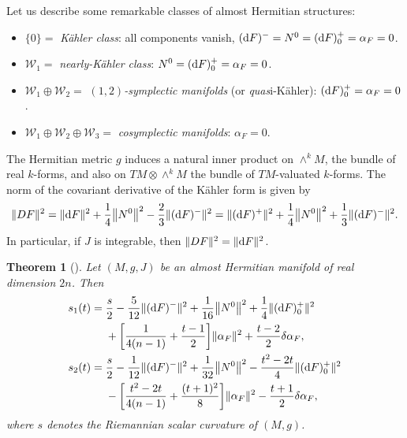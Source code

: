 \documentclass[pdftex]{sigma}%
\numberwithin{equation}{section}
\newtheorem{Theorem}{Theorem}[section]
\begin{document}
Let us describe some remarkable classes of almost Hermitian structures:
\begin{itemize}\itemsep=0pt

\item $\{0\}=$ {\em K\"ahler class}: all components vanish, $({\rm d}F)^{-}= N^{0}=({\rm d}F)^{+}_{0}=\alpha_{F}=0$.

\item $\mathcal{W}_{1}=$ {\em nearly-K\"ahler class}: $N^{0} = ({\rm d}F)^{+}_{0}= \alpha_{F}=0$.

\item $\mathcal{W}_{1}\oplus \mathcal{W}_{2}=$ {\em $(1,2)$-symplectic manifolds} (or {\it quas}i-K\"ahler): $({\rm d}F)^{+}_{0}=\alpha_{F}=0$.

\item $\mathcal{W}_{1}\oplus \mathcal{W}_{2}\oplus \mathcal{W}_{3}=$ {\em cosymplectic manifolds}: $\alpha_{F}=0$.
\end{itemize}

The Hermitian metric $g$ induces a natural inner product on $\wedge^{k}M$, the bundle of real $k$-forms, and also on $TM\otimes \wedge^{k}M$ the bundle of $TM$-valuated $k$-forms. The norm of the covariant derivative of the K\"ahler form is given by
\begin{align*}
\|DF\|^{2}=\|{\rm d}F\|^{2}+\dfrac{1}{4}\big\|N^{0}\big\|^{2}-\dfrac{2}{3}\|({\rm d}F)^{-}\|^{2}
=\|({\rm d}F)^{+}\|^{2}+\dfrac{1}{4}\big\|N^{0}\big\|^{2}+\dfrac{1}{3}\|({\rm d}F)^{-}\|^{2}.
\end{align*}
In particular, if $J$ is integrable, then $\|DF\|^{2}=\|{\rm d}F\|^{2}$.

\begin{Theorem}[{\cite[Theorem 4.3]{fu}}]\label{teo1}
Let $(M,g,J)$ be an almost Hermitian manifold of real dimension $2n$. Then
\begin{align*}
s_{1}(t)={}&\dfrac{s}{2}-\dfrac{5}{12}\|({\rm d}F)^{-}\|^{2}+\dfrac{1}{16}\big\|N^{0}\big\|^{2}+\dfrac{1}{4}\|({\rm d}F)_{0}^{+}\|^{2}
\\
&+\bigg[\dfrac{1}{4(n-1)}+\dfrac{t-1}{2}\bigg]\|\alpha_{F}\|^{2}+\dfrac{t-2}{2}\delta\alpha_{F},
\\
s_{2}(t)={}&\frac{s}{2}-\frac{1}{12}\|({\rm d}F)^{-}\|^{2}+\frac{1}{32}\big\|N^{0}\big\|^{2}-\dfrac{t^{2}-2t}{4}\|({\rm d}F)_{0}^{+}\|^{2}
\\
&-\bigg[\dfrac{t^{2}-2t}{4(n-1)}+\dfrac{(t+1)^{2}}{8}\bigg]\|\alpha_{F}\|^{2}-\dfrac{t+1}{2}\delta\alpha_{F},
\end{align*}
where $s$ denotes the Riemannian scalar curvature of $(M,g)$.
\end{Theorem}
\end{document}
